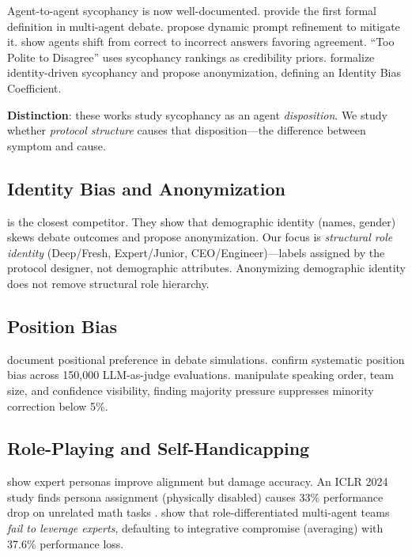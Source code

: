 \documentclass[11pt]{article}
\theoremstyle{definition}
\begin{document}
Agent-to-agent sycophancy is now well-documented. \citet{yao2025peacemaker} provide the first formal definition in multi-agent debate. \citet{pitre2025consensagent} propose dynamic prompt refinement to mitigate it. \citet{wynn2025talk} show agents shift from correct to incorrect answers favoring agreement. ``Too Polite to Disagree'' \citep{toopolite2026} uses sycophancy rankings as credibility priors. \citet{choi2025identity} formalize identity-driven sycophancy and propose anonymization, defining an Identity Bias Coefficient.

\textbf{Distinction}: these works study sycophancy as an agent \emph{disposition}. We study whether \emph{protocol structure} causes that disposition---the difference between symptom and cause.

\subsection{Identity Bias and Anonymization}

\citet{choi2025identity} is the closest competitor. They show that demographic identity (names, gender) skews debate outcomes and propose anonymization. Our focus is \emph{structural role identity} (Deep/Fresh, Expert/Junior, CEO/Engineer)---labels assigned by the protocol designer, not demographic attributes. Anonymizing demographic identity does not remove structural role hierarchy.

\subsection{Position Bias}

\citet{taubenfeld2024systematic} document positional preference in debate simulations. \citet{shi2025judging} confirm systematic position bias across 150,000 LLM-as-judge evaluations. \citet{wu2025debate} manipulate speaking order, team size, and confidence visibility, finding majority pressure suppresses minority correction below 5\%.

\subsection{Role-Playing and Self-Handicapping}

\citet{hu2026expert} show expert personas improve alignment but damage accuracy. An ICLR 2024 study finds persona assignment (physically disabled) causes 33\% performance drop on unrelated math tasks \citep{persona2024iclr}. \citet{pappu2026experts} show that role-differentiated multi-agent teams \emph{fail to leverage experts}, defaulting to integrative compromise (averaging) with 37.6\% performance loss.
\end{document}
